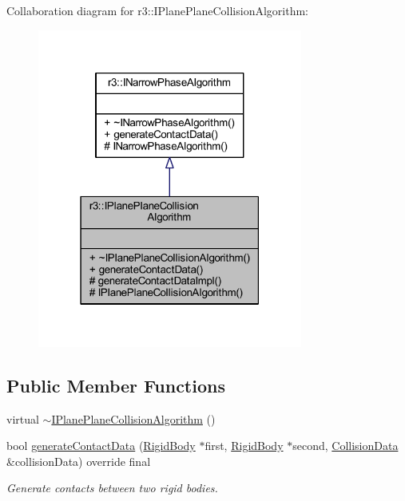 Collaboration diagram for r3\+:\+:I\+Plane\+Plane\+Collision\+Algorithm\+:\nopagebreak
\begin{figure}[H]
\begin{center}
\leavevmode
\includegraphics[width=247pt]{classr3_1_1_i_plane_plane_collision_algorithm__coll__graph}
\end{center}
\end{figure}
\subsection*{Public Member Functions}
\begin{DoxyCompactItemize}
\item 
virtual \mbox{\hyperlink{classr3_1_1_i_plane_plane_collision_algorithm_a93e78b07d3d296f30a5ab926a3a42323}{$\sim$\+I\+Plane\+Plane\+Collision\+Algorithm}} ()
\item 
bool \mbox{\hyperlink{classr3_1_1_i_plane_plane_collision_algorithm_a910587be6f6537f86bbcc5e3a9b40223}{generate\+Contact\+Data}} (\mbox{\hyperlink{classr3_1_1_rigid_body}{Rigid\+Body}} $\ast$first, \mbox{\hyperlink{classr3_1_1_rigid_body}{Rigid\+Body}} $\ast$second, \mbox{\hyperlink{classr3_1_1_collision_data}{Collision\+Data}} \&collision\+Data) override final
\begin{DoxyCompactList}\small\item\em Generate contacts between two rigid bodies. \end{DoxyCompactList}\end{DoxyCompactItemize}
